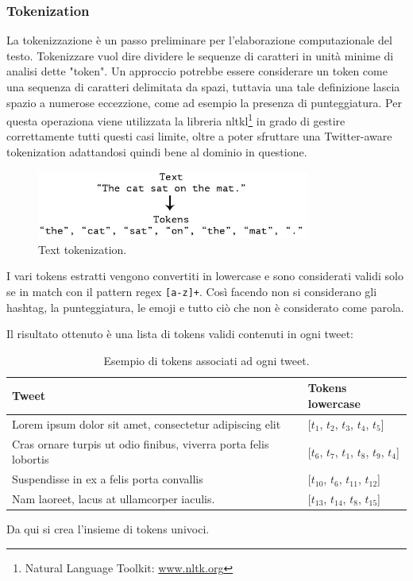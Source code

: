 \documentclass[oneside]{book}
\begin{document}
\subsubsection{Tokenization}
La tokenizzazione è un passo preliminare per l'elaborazione computazionale del testo. Tokenizzare vuol dire dividere le sequenze di caratteri in unità minime di analisi dette "token". Un approccio potrebbe essere considerare un token come una sequenza di caratteri delimitata da spazi, tuttavia una tale definizione lascia spazio a numerose eccezzione, come ad esempio la presenza di punteggiatura. Per questa operaziona viene utilizzata la libreria
nltkl\footnote{Natural Language Toolkit: \url{www.nltk.org}} in grado di gestire correttamente tutti questi casi limite, oltre a poter sfruttare una Twitter-aware tokenization adattandosi quindi bene al dominio in questione.

\begin{figure}[!h]
	\centering
	\includegraphics[width=9cm]{assets/text-to-tokens.jpg}
	\caption{Text tokenization.}
	\label{fig:tokenization}
\end{figure}


\pagebreak

I vari tokens estratti vengono convertiti in lowercase e sono considerati validi solo se in match con il pattern regex \texttt{[a-z]+}. Così facendo non si considerano gli hashtag, la punteggiatura, le emoji e tutto ciò che non è considerato come parola.

Il risultato ottenuto è una lista di tokens validi contenuti in ogni tweet:

\begin{table}[h!]
	\centering
	\begin{tabular}[t]{l|l}
		\hline
		\textbf{Tweet} & \textbf{Tokens lowercase}\\
		\hline
		Lorem ipsum dolor sit amet, consectetur adipiscing elit				& [$t_1$, $t_2$, $t_3$, $t_4$, $t_5$] \\
		Cras ornare turpis ut odio finibus, viverra porta felis lobortis 	& [$t_6$, $t_7$, $t_1$, $t_8$, $t_9$, $t_4$] \\
		Suspendisse in ex a felis porta convallis							& [$t_{10}$, $t_6$, $t_{11}$, $t_{12}$] \\
		Nam laoreet, lacus at ullamcorper iaculis.							& [$t_{13}$, $t_{14}$, $t_8$, $t_{15}$]\\
		
		\hline
	\end{tabular}
	\caption{Esempio di tokens associati ad ogni tweet.}
\end{table}
\noindent
Da qui si crea l'insieme di tokens univoci.
\end{document}
